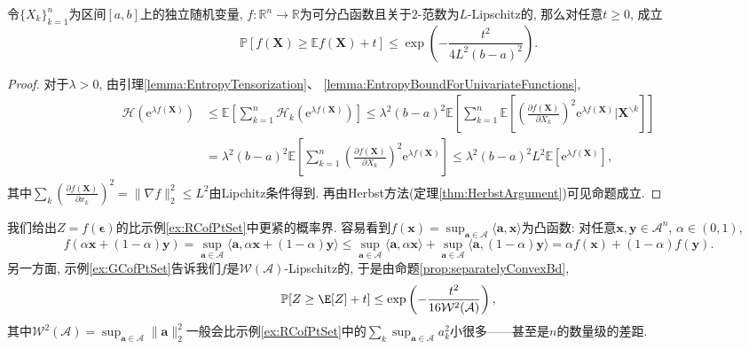 \begin{proposition}\label{prop:separatelyConvexBd}
	令$\{X_k\}_{k=1}^n$为区间$[a, b]$上的独立随机变量, $f \colon \mathbb{R}^n \to \mathbb{R}$为可分凸函数且关于$2$-范数为$L$-Lipschitz的, 那么对任意$t \geq 0$, 成立
	\begin{equation*}
		\mathbb{P}[f(\bm{X}) \geq \mathbb{E}f(\bm{X}) + t] 
		\leq \exp \left( - \frac{t^2}{4L^2 (b-a)^2} \right). 
	\end{equation*}	
\end{proposition}
\begin{proof}
	对于$\lambda > 0$, 由引理\ref{lemma:EntropyTensorization}、 \ref{lemma:EntropyBoundForUnivariateFunctions}, 
	\begin{align*}
		\mathcal{H}(\mathrm{e}^{\lambda f(\bm{X})})
		&\leq \mathbb{E}\left[ \sum_{k=1}^n \mathcal{H}_k (\mathrm{e}^{\lambda f(\bm{X})}) \right]
		\leq \lambda^2 (b-a)^2  \mathbb{E}\left[ \sum_{k=1}^n \mathbb{E}\left[ \left(\frac{\partial f(\bm{X})}{\partial X_k} \right)^2 \mathrm{e}^{\lambda f(\bm{X})} \bigg| \bm{X}^{\backslash k} \right] \right] \\
		&= \lambda^2 (b-a)^2  \mathbb{E}\left[ \sum_{k=1}^n \left(\frac{\partial f(\bm{X})}{\partial X_k} \right)^2 \mathrm{e}^{\lambda f(\bm{X})}\right]
		\leq \lambda^2 (b-a)^2 L^2 \mathbb{E}[\mathrm{e}^{\lambda f(\bm{X})}], 
	\end{align*}
	其中$\sum_k \left( \frac{\partial f(\bm{X})}{\partial x_k} \right)^2 = \|\nabla f\|_2^2 \leq L^2$由Lipchitz条件得到. 
	再由Herbst方法(定理\ref{thm:HerbstArgument})可见命题成立. 
\end{proof}

\begin{example}[点集的Rademacher复杂度']
	我们给出$Z = f(\bm{\epsilon})$的比示例\ref{ex:RCofPtSet}中更紧的概率界. 
	容易看到$f(\bm{x}) = \sup_{\bm{a} \in \mathcal{A}} \langle \bm{a}, \bm{x} \rangle$为凸函数: 对任意$\bm{x}, \bm{y} \in \mathcal{A}^n$, $\alpha \in (0,1)$, 
	\begin{equation*}
		f(\alpha \bm{x} + (1-\alpha) \bm{y})
		= \sup_{\bm{a} \in \mathcal{A}} \langle \bm{a}, \alpha \bm{x} + (1-\alpha) \bm{y} \rangle
		\leq \sup_{\bm{a} \in \mathcal{A}} \langle \bm{a}, \alpha \bm{x} \rangle + \sup_{\bm{a} \in \mathcal{A}} \langle \bm{a}, (1-\alpha) \bm{y} \rangle
		= \alpha f(\bm{x}) + (1-\alpha) f(\bm{y}).  
	\end{equation*}
	另一方面, 示例\ref{ex:GCofPtSet}告诉我们$f$是$\mathcal{W}(\mathcal{A})$-Lipschitz的, 于是由命题\ref{prop:separatelyConvexBd}, 
	\begin{equation*}
		\mathbb{P}[Z \geq \E[Z] + t] \leq \exp \left( - \frac{t^2}{16\mathcal{W}^2(\mathcal{A})} \right), 
	\end{equation*}
	其中$\mathcal{W}^2(\mathcal{A}) = \sup_{\bm{a} \in \mathcal{A}}\|\bm{a}\|_2^2$一般会比示例\ref{ex:RCofPtSet}中的$\sum_k \sup_{\bm{a} \in \mathcal{A}} a_k^2$小很多——甚至是$n$的数量级的差距. 
\end{example}

